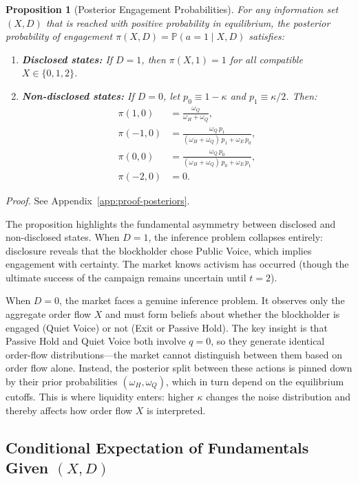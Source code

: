 \documentclass[11pt]{article}
\newtheorem{proposition}{Proposition}
\newcommand{\PP}{\mathbb{P}}
\newcommand{\1}{\mathbf{1}}
\begin{document}
\begin{proposition}[Posterior Engagement Probabilities]
\label{prop:posteriors}
For any information set $(X,D)$ that is reached with positive probability in equilibrium, the posterior probability of engagement $\pi(X,D) = \PP(a=1 \mid X, D)$ satisfies:
\begin{enumerate}[label=(\alph*)]
\item \textbf{Disclosed states:} If $D = 1$, then $\pi(X, 1) = 1$ for all compatible $X \in \{0, 1, 2\}$.
\item \textbf{Non-disclosed states:} If $D = 0$, let $p_0 \equiv 1 - \kappa$ and $p_1 \equiv \kappa/2$. Then:
\begin{align*}
\pi(1, 0) &= \frac{\omega_Q}{\omega_H + \omega_Q}, \\
\pi(-1, 0) &= \frac{\omega_Q \, p_1}{(\omega_H + \omega_Q) \, p_1 + \omega_E \, p_0}, \\
\pi(0, 0) &= \frac{\omega_Q \, p_0}{(\omega_H + \omega_Q) \, p_0 + \omega_E \, p_1}, \\
\pi(-2, 0) &= 0.
\end{align*}
\end{enumerate}
\end{proposition}
\textit{Proof.} See Appendix~\ref{app:proof-posteriors}.

The proposition highlights the fundamental asymmetry between disclosed and non-disclosed states. When $D=1$, the inference problem collapses entirely: disclosure reveals that the blockholder chose Public Voice, which implies engagement with certainty. The market knows activism has occurred (though the ultimate success of the campaign remains uncertain until $t=2$).

When $D=0$, the market faces a genuine inference problem. It observes only the aggregate order flow $X$ and must form beliefs about whether the blockholder is engaged (Quiet Voice) or not (Exit or Passive Hold). The key insight is that Passive Hold and Quiet Voice both involve $q=0$, so they generate identical order-flow distributions---the market cannot distinguish between them based on order flow alone. Instead, the posterior split between these actions is pinned down by their prior probabilities $(\omega_H,\omega_Q)$, which in turn depend on the equilibrium cutoffs. This is where liquidity enters: higher $\kappa$ changes the noise distribution and thereby affects how order flow $X$ is interpreted.

\subsection{Conditional Expectation of Fundamentals Given \texorpdfstring{$(X,D)$}{(X,D)}}
\end{document}
